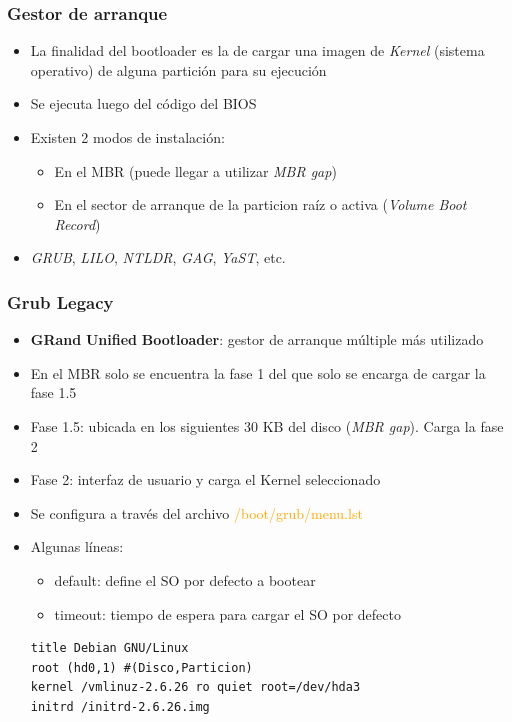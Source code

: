 \begin{frame}
	\frametitle{Gestor de arranque}
	\begin{itemize}
		\item La finalidad del bootloader es la de cargar una imagen de \textit{Kernel} (sistema operativo) de alguna partición para su ejecución
		\item Se ejecuta luego del código del BIOS		
		\item Existen 2 modos de instalación:
		\begin{itemize}
			\item En el MBR (puede llegar a utilizar \textit{MBR gap})
			\item En el sector de arranque de la particion raíz o activa (\textit{Volume Boot Record})
		\end{itemize}
		\item \emph{GRUB}, \emph{LILO}, \emph{NTLDR}, \emph{GAG}, \emph{YaST}, etc.
	\end{itemize}
\end{frame}

\begin{frame}[fragile]
	\frametitle{Grub Legacy}
	\begin{itemize}
		\item \textbf{GRand} \textbf{Unified} \textbf{Bootloader}: gestor de arranque múltiple más utilizado
		\item En el MBR solo se encuentra la fase 1 del que solo se encarga de cargar la fase 1.5
		\item Fase 1.5: ubicada en los siguientes 30 KB del disco (\textit{MBR gap}). Carga la fase 2
		\item Fase 2: interfaz de usuario y carga el Kernel seleccionado
		\item Se configura a través del archivo \textcolor{orange}{/boot/grub/menu.lst}
		\item Algunas líneas:
		\begin{itemize}
			\item default: define el SO por defecto a bootear
			\item timeout: tiempo de espera para cargar el SO por defecto
		\end{itemize}
		\begin{lstlisting}
title Debian GNU/Linux
root (hd0,1) #(Disco,Particion)
kernel /vmlinuz-2.6.26 ro quiet root=/dev/hda3
initrd /initrd-2.6.26.img
		\end{lstlisting}		
	\end{itemize}
\end{frame}

